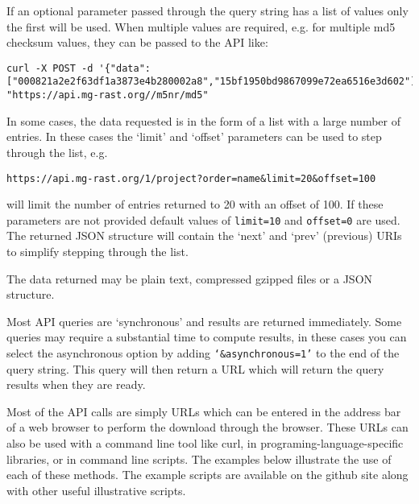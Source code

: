 If an optional parameter passed through the query string has a list of values only the first will be used. When multiple values are required, e.g. for multiple md5 checksum values, they can be passed to the API like:
\begin{small}
\begin{lstlisting}
curl -X POST -d '{"data":["000821a2e2f63df1a3873e4b280002a8","15bf1950bd9867099e72ea6516e3d602"]}' "https://api.mg-rast.org//m5nr/md5"
\end{lstlisting}
\end{small}

In some cases, the data requested is in the form of a list with a large number of entries. In these cases the `limit' and `offset' parameters can be used to step through the list, e.g.
\begin{small}
\begin{lstlisting}
https://api.mg-rast.org/1/project?order=name&limit=20&offset=100
\end{lstlisting}
\end{small} will limit the number of entries returned to 20 with an offset of 100. If these parameters are not provided default values of \texttt{limit=10} and \texttt{offset=0} are used. The returned JSON structure will contain the `next' and `prev' (previous) URIs to simplify stepping through the list.

The data returned may be plain text, compressed gzipped files or a JSON structure.

Most API queries are `synchronous' and results are returned immediately. Some queries may require a substantial time to compute results, in these cases you can select the asynchronous option by adding \texttt{`\&asynchronous=1'} to the end of the query string. This query will then return a URL which will return the query results when they are ready.

Most of the API calls are simply URLs which can be entered in the address bar of a web browser to perform the download through the browser. These URLs can also be used with a command line tool like curl, in programing-language-specific libraries, or in command line scripts. The examples below illustrate the use of each of these methods. The example scripts are available on the github site along with other useful illustrative scripts.

